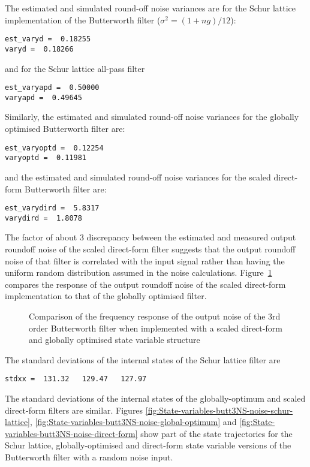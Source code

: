 \documentclass[a4paper,twoside,10pt,english]{report}
\begin{document}
The estimated and simulated round-off noise variances are for the Schur lattice
implementation of the Butterworth filter ($\sigma^{2}=\left(1+ng\right)/12$):
\begin{small}
\begin{verbatim}
est_varyd =  0.18255
varyd =  0.18266
\end{verbatim}
\end{small}
and for the Schur lattice all-pass filter
\begin{small}
\begin{verbatim}
est_varyapd =  0.50000
varyapd =  0.49645
\end{verbatim}
\end{small}
Similarly, the estimated and simulated round-off noise variances for the
globally optimised Butterworth filter are:
\begin{small}
\begin{verbatim}
est_varyoptd =  0.12254
varyoptd =  0.11981
\end{verbatim}
\end{small}
and the estimated and simulated round-off noise variances for the scaled 
direct-form Butterworth filter are:
\begin{small}
\begin{verbatim}
est_varydird =  5.8317
varydird =  1.8078
\end{verbatim}
\end{small}
The factor of about $3$ discrepancy between the estimated and measured
output roundoff noise of the scaled direct-form filter suggests that the
output roundoff noise of that filter is correlated with the input signal
rather than having the uniform random distribution assumed in the noise 
calculations. Figure~\ref{fig:Freq-response-butt3NS-direct-form-noise} 
compares the response of the output roundoff noise of the scaled direct-form 
implementation to that of the globally optimised filter.
\begin{figure}[!htbp]
\begin{center}
\scalebox{0.7}{}
\caption{Comparison of the frequency response of the output noise of the 3rd order Butterworth filter when implemented with a scaled direct-form and globally optimised state variable structure}
\label{fig:Freq-response-butt3NS-direct-form-noise}
\end{center}
\end{figure}

The standard deviations of the internal states of the Schur lattice filter are
\begin{small}
\begin{verbatim}
stdxx =  131.32   129.47   127.97
\end{verbatim}
\end{small}
The standard deviations of the internal states of the globally-optimum and
scaled direct-form filters are similar. Figures 
\ref{fig:State-variables-butt3NS-noise-schur-lattice},
\ref{fig:State-variables-butt3NS-noise-global-optimum} and
\ref{fig:State-variables-butt3NS-noise-direct-form} show part of the state
trajectories for the Schur lattice, globally-optimised and direct-form
state variable versions of the Butterworth filter with a random noise input.
\end{document}
